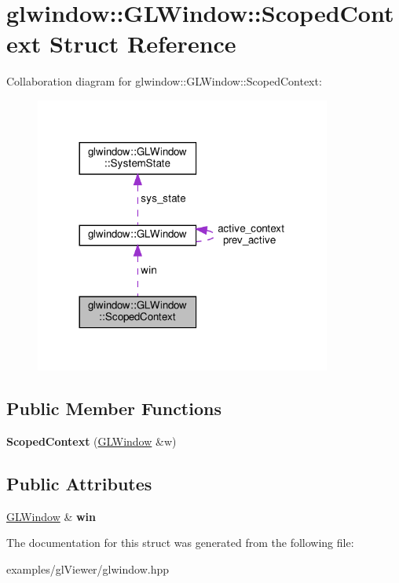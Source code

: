 \hypertarget{structglwindow_1_1_g_l_window_1_1_scoped_context}{}\section{glwindow\+:\+:G\+L\+Window\+:\+:Scoped\+Context Struct Reference}
\label{structglwindow_1_1_g_l_window_1_1_scoped_context}


Collaboration diagram for glwindow\+:\+:G\+L\+Window\+:\+:Scoped\+Context\+:
\nopagebreak
\begin{figure}[H]
\begin{center}
\leavevmode
\includegraphics[width=276pt]{structglwindow_1_1_g_l_window_1_1_scoped_context__coll__graph}
\end{center}
\end{figure}
\subsection*{Public Member Functions}
\begin{DoxyCompactItemize}
\item 
\mbox{\label{structglwindow_1_1_g_l_window_1_1_scoped_context_a50c8bb3920c309f393427a712ef92fab}} 
{\bfseries Scoped\+Context} (\hyperlink{classglwindow_1_1_g_l_window}{G\+L\+Window} \&w)
\end{DoxyCompactItemize}
\subsection*{Public Attributes}
\begin{DoxyCompactItemize}
\item 
\mbox{\label{structglwindow_1_1_g_l_window_1_1_scoped_context_a4d650e6dd6b405ea6f6b344b3e98a3af}} 
\hyperlink{classglwindow_1_1_g_l_window}{G\+L\+Window} \& {\bfseries win}
\end{DoxyCompactItemize}


The documentation for this struct was generated from the following file\+:\begin{DoxyCompactItemize}
\item 
examples/gl\+Viewer/glwindow.\+hpp\end{DoxyCompactItemize}
